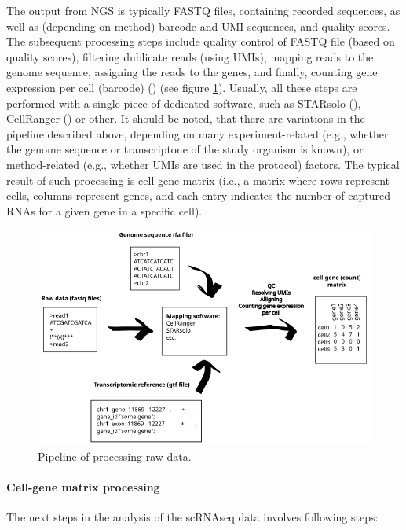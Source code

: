 The output from NGS is typically FASTQ files, containing recorded sequences,
as well as (depending on method) barcode and UMI sequences, and quality scores.
The subsequent processing steps include quality control of FASTQ file (based on quality scores),
filtering dublicate reads (using UMIs), mapping reads to the genome sequence, assigning the reads to the genes,
and finally, counting gene expression per cell (barcode) (\cite{Heumos2023}) (see figure \ref{fig:rawData}).
Usually, all these steps are performed with a single piece of dedicated software,
such as STARsolo (\cite{Kaminow2021}), CellRanger (\cite{Zheng2017}) or other.
It should be noted, that there are variations in the pipeline described above,
depending on many experiment-related (e.g., whether the genome sequence or transcriptone of the study organism is known),
or method-related (e.g., whether UMIs are used in the protocol) factors.
The typical result of such processing is cell-gene matrix (i.e., a matrix where rows represent cells,
columns represent genes, and each entry indicates the number of captured RNAs for a given gene in a specific cell).

\begin{figure}
  \centering
  \includegraphics[width=\linewidth]{images/rawdata.png}
  \caption{Pipeline of processing raw data.}
  \label{fig:rawData}
\end{figure}

\paragraph{Cell-gene matrix processing}

The next steps in the analysis of the scRNAseq data involves following steps:

